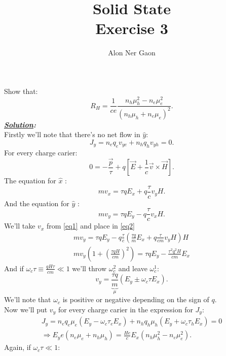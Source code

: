 \documentclass[notitlepage]{report}
\title{\Huge{Solid State}\\Exercise 3}
\author{Alon Ner Gaon}
\begin{document}
\maketitle

\begin{question}[title = Question 1]{}{}
Show that:\\
\[
	R_H= \frac{1}{ce} \frac{n_h\mu_h^2-n_e\mu_e^2}{\left(n_h\mu_h+n_e\mu_e\right)^2 }
.\] 
\tcblower
\textbf{\emph{\underline{Solution}:}}\\
Firstly we'll note that there's no net flow in $\hat{y}$:\\
\[
	J_y=n_eq_ev_{ye}+n_hq_hv_{yh}=0
.\] 
For every charge carier:\\
	\[
	0=-\frac{\vec{p}}{\tau}+q\left[\vec{E}+\frac{1}{c}\vec{v}\times \vec{H}\right] 
	.\] 
The equation for $\hat{x}$ :\\
\begin{equation}
	mv_x=\tau qE_x+q\frac{\tau}{c}v_yH\label{eq1}
.\end{equation}
And the equation for $\hat{y}$ :\\
\begin{equation}
	mv_y=\tau qE_y-q\frac{\tau}{c}v_xH\label{eq2}
.\end{equation}
We'll take $v_x$ from \eqref{eq1} and place in \eqref{eq2}\\
\begin{gather*}
	mv_y = \tau qE_y-q\frac{\tau}{c}\left(\frac{\tau q}{m}E_x+q\frac{\tau}{cm}v_yH\right)H\label{eq2}\\
mv_y\left(1+\left(\frac{\tau qH}{cm}\right)^2 \right) = \tau qE_y-\frac{\tau^2q^2H}{cm}E_x
\end{gather*}
And if $\omega_c\tau\equiv \frac{qH\tau}{cm}\ll1$ we'll throw $\omega_c^2$ and leave $\omega_c^1$:\\
\[
	v_y=\underbrace{\frac{\tau q}{m}}_{\mu}\left(E_y\pm\omega_c\tau E_x\right) 
.\] 
We'll note that $\omega_c$ is positive or negative depending on the sign of $q$.\\
\tcbbreak
Now we'll put $v_y$ for every charge carier in the expression for $J_y$:\\
\begin{gather*}
	J_y=n_eq_e\mu_e\left(E_y-\omega_c\tau_eE_x\right)+n_hq_h\mu_h\left(E_y+\omega_c\tau_h E_x\right)=0\\
\Rightarrow E_ye\left(n_e\mu_e+n_h\mu_h\right)=\frac{He}{c}E_x\left(n_h\mu_h^2-n_e\mu_e^2\right)  
.\end{gather*}
Again, if $\omega_c\tau\ll 1$:\\

\end{question}
\end{document}
